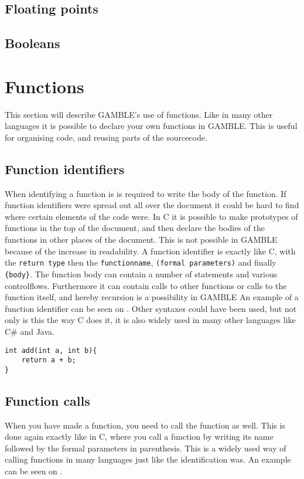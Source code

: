 \subsection{Floating points}

\subsection{Booleans}

\section{Functions}
This section will describe GAMBLE's use of functions. 
Like in many other languages it is possible to declare your own functions in GAMBLE.
This is useful for organising code, and reusing parts of the sourcecode.

\subsection{Function identifiers}
When identifying a function is is required to write the body of the function.
If function identifiers were spread out all over the document it could be hard to find where certain elements of the code were.
In C it is possible to make prototypes of functions in the top of the document, and then declare the bodies of the functions in other places of the document. 
This is not possible in GAMBLE because of the increase in readability.
A function identifier is exactly like C, with the \texttt{return type} then the \texttt{functionname}, \texttt{(formal parameters)} and finally \texttt{\{body\}}.
The function body can contain a number of statements and various controlflows.
Furthermore it can contain calls to other functions or calls to the function itself, and hereby recursion is a possibility in GAMBLE
An example of a function identifier can be seen on .
Other syntaxes could have been used, but not only is this the way C does it, it is also widely used in many other languages like C\# and Java.

\begin{lstlisting}[label=functionID]                                                                           %LOL%
int add(int a, int b){
	return a + b;
}
\end{lstlisting}

\subsection{Function calls}
When you have made a function, you need to call the function as well.
This is done again exactly like in C, where you call a function by writing its name followed by the formal parameters in parenthesis.
This is a widely used way of calling functions in many languages just like the identification was.
An example can be seen on .

